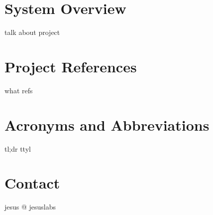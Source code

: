 \section{System Overview}
talk about project
\section{Project References}
what refs
\section{Acronyms and Abbreviations}
tl;dr ttyl
\section{Contact}
jesus @ jesuslabs